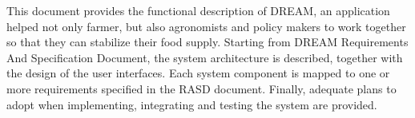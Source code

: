 \documentclass[../../main.tex]{subfiles}
\begin{document}
This document provides the functional description of DREAM, an application helped not only farmer, but also agronomists and policy makers to work together so that they can stabilize their food supply.  Starting  from DREAM  Requirements  And  Specification  Document, the system architecture is described, together with the design of the user interfaces.  Each system component is mapped to one or more requirements specified in the RASD document.  Finally, adequate plans to adopt when implementing, integrating and testing the system are provided. 
\end{document}
